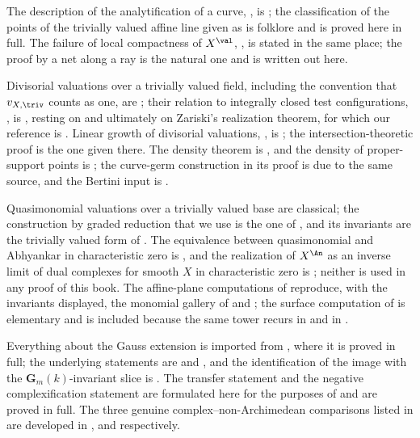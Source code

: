 The description of the analytification of a curve, , is
\cite[\S1.1.6]{BJ22}; the classification of the points of the trivially
valued affine line given as  is folklore and
is proved here in full.  The failure of local compactness of $X^{\val}$,
, is stated in the same place; the
proof by a net along a ray is the natural one and is written out here.

Divisorial valuations over a trivially valued field, including the convention
that $v_{X,\triv}$ counts as one, are \cite[\S1.1.1]{BJ22}; their relation
to integrally closed test configurations, , is
\cite[Lemma~1.20]{BJ22}, resting on \cite[Theorem~4.6]{BHJ17} and ultimately
on Zariski's realization theorem, for which our reference is
\cite[Ch.~VI]{ZariskiSamuelII}.  Linear growth of divisorial valuations,
, is \cite[Proposition~1.28]{BJ22};
the intersection-theoretic proof is the one given there.  The density theorem
 is \cite[Theorem~2.14]{BJ22}, and the
density of proper-support points  is
\cite[Lemma~2.15]{BJ22}; the curve-germ construction in its proof is due to
the same source, and the Bertini input is \cite[\S6]{Jou80}.

Quasimonomial valuations over a trivially valued base are classical; the
construction by graded reduction that we use is the one of
, and its invariants
 are the trivially valued form of
.  The equivalence between
quasimonomial and Abhyankar in characteristic zero is
\cite[\S3]{JM12}, and the realization of $X^{\An}$ as an inverse limit of
dual complexes for smooth $X$ in characteristic zero is
\cite[Appendix~A]{BJ22}; neither is used in any proof of this book.  The
affine-plane computations of  reproduce, with the
invariants displayed, the monomial gallery of
 and ; the
surface computation of  is elementary and is
included because the same tower recurs in 
and in .

Everything about the Gauss extension is imported from
, where it is proved in full; the underlying statements
are \cite[\S1.3]{BJ22} and \cite[Lemma~4.2]{BHJ17}, and the identification of
the image with the $\mathbf G_m(k)$-invariant slice is
\cite[Remark~1.9]{BJ22}.  The transfer statement
 and the negative complexification statement
 are formulated here for the purposes
of  and are proved in full.  The three genuine
complex--non-Archimedean comparisons listed in
 are developed in
,  and
 respectively.

